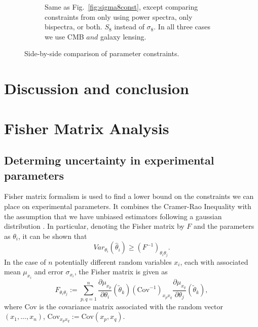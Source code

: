 \documentclass[11pt]{article} %
\newcommand{\br}[1]{\ensuremath{\left( #1 \right)}}
\begin{document}
\begin{figure}[htbp]
\begin{subfigure}[t]{0.48\textwidth}
        \caption{Same as Fig.~\ref{fig:sigma8const}, except comparing constraints from only using power spectra, only bispectra, or both. $S_8$ instead of $\sigma_8$. In all three cases we use CMB $and$ galaxy lensing.}
        \label{fig:S8const}
    \end{subfigure}
    \caption{Side-by-side comparison of parameter constraints.}
    \label{fig:side_by_side}
\end{figure}

\section{Discussion and conclusion}\label{sec:discussion}
\printbibliography

\appendix

\section{Fisher Matrix Analysis} \label{sec:fisher}
\subsection{Determing uncertainty in experimental parameters}

Fisher matrix formalism is used to find a lower bound on the constraints we can place on experimental parameters. It combines the Cramer-Rao Inequality \cite{casella2002statistical} with the assumption that we have unbiased estimators  following a gaussian distribution \cite{dodelson2020modern}. In particular, denoting the Fisher matrix by $F$ and the parameters as $\theta_i$, it can be shown that
\begin{equation}
    Var_{\theta_i}(\hat\theta_i) \geq \br{F^{-1}}_{\theta_i\theta_j}.
\end{equation}
In the case of $n$ potentially different random variables $x_i$, each with associated mean $\mu_{x_i}$ and error $\sigma_{x_i}$, the Fisher matrix is given as
\begin{equation}
    F_{\theta_i\theta_j} := \sum_{p, q=1}^n \frac{\partial\mu_{x_p}}{\partial\theta_i}(\tilde\theta_k)(\text{Cov}^{-1})_{x_px_q}\frac{\partial\mu_{x_q}}{\partial\theta_j}(\tilde\theta_k),
\end{equation}
where Cov is the covariance matrix associated with the random vector $(x_1, ..., x_n)$, $\text{Cov}_{x_px_q}:=\text{Cov}(x_p,x_q)$.
\end{document}
